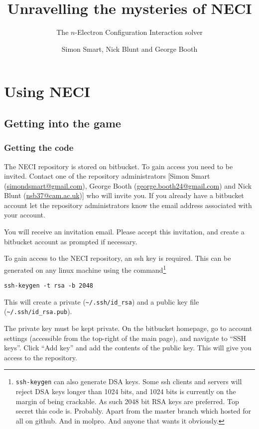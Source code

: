 \documentclass[a4paper,notitlepage]{scrreprt}
\makeatletter
\let\code\lstinline
\newcommand*{\toccontents}{\@starttoc{toc}}
\makeatother
\begin{document}
\author{Simon Smart, Nick Blunt and George Booth}
\title{Unravelling the mysteries of NECI}
\subtitle{The $n$-Electron Configuration Interaction solver}
\maketitle

\toccontents

\chapter{Using NECI}
\section{Getting into the game}
\subsection{Getting the code}
	The NECI repository is stored on bitbucket. To gain access you need to be
	invited. Contact one of the repository administrators
	[Simon Smart (\url{simondsmart@gmail.com}), George Booth
	(\url{george.booth24@gmail.com}) and Nick Blunt (\url{nsb37@cam.ac.uk})] who will
	invite you. If you already have a bitbucket account let the repository
	administrators know the email address associated with your account.

	You will receive an invitation email. Please accept this invitation, and
	create a bitbucket account as prompted if necessary.

	To gain access to the NECI repository, an ssh key is required. This can
	be generated on any linux machine using the command\footnote{%
		\code{ssh-keygen} can also generate DSA keys. Some ssh clients and
		servers will reject DSA keys longer than 1024 bits, and 1024 bits is
		currently on the margin of being crackable. As such 2048 bit RSA keys
		are preferred. Top secret this code is. Probably. Apart from the master branch which hosted for all on github. And in molpro.
		And anyone that wants it obviously.
	}
	\begin{lstlisting}[gobble=4]
		ssh-keygen -t rsa -b 2048
	\end{lstlisting}%
	This will create a private (\code{~/.ssh/id_rsa}) and a public key
	file (\code{~/.ssh/id_rsa.pub}).
	
	The private key must be kept private. On the bitbucket homepage, go to
	account settings (accessible from the top-right	of the main page), and
	navigate to ``SSH keys''. Click ``Add key'' and add the contents of the
	public key. This will give you access to the repository.
\end{document}
